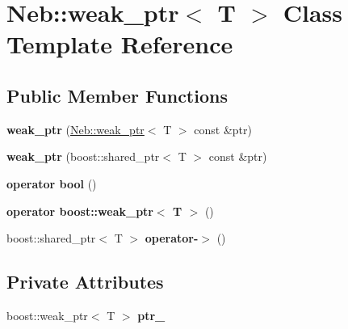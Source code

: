 \hypertarget{classNeb_1_1weak__ptr}{\section{\-Neb\-:\-:weak\-\_\-ptr$<$ \-T $>$ \-Class \-Template \-Reference}
\label{classNeb_1_1weak__ptr}
}
\subsection*{\-Public \-Member \-Functions}
\begin{DoxyCompactItemize}
\item 
\hypertarget{classNeb_1_1weak__ptr_a831fec6c1355a9d91e834099c0dc6227}{{\bfseries weak\-\_\-ptr} (\hyperlink{classNeb_1_1weak__ptr}{\-Neb\-::weak\-\_\-ptr}$<$ \-T $>$ const \&ptr)}\label{classNeb_1_1weak__ptr_a831fec6c1355a9d91e834099c0dc6227}

\item 
\hypertarget{classNeb_1_1weak__ptr_ad29ba574546701e7ed8a0b452dcd76a6}{{\bfseries weak\-\_\-ptr} (boost\-::shared\-\_\-ptr$<$ \-T $>$ const \&ptr)}\label{classNeb_1_1weak__ptr_ad29ba574546701e7ed8a0b452dcd76a6}

\item 
\hypertarget{classNeb_1_1weak__ptr_a04c92f7e5ec8e3e83d2abce8365b8feb}{{\bfseries operator bool} ()}\label{classNeb_1_1weak__ptr_a04c92f7e5ec8e3e83d2abce8365b8feb}

\item 
\hypertarget{classNeb_1_1weak__ptr_ab67828010c104deb340eb460148b651d}{{\bfseries operator boost\-::weak\-\_\-ptr$<$ T $>$} ()}\label{classNeb_1_1weak__ptr_ab67828010c104deb340eb460148b651d}

\item 
\hypertarget{classNeb_1_1weak__ptr_afb380fd10451d5f26809091e54cde62f}{boost\-::shared\-\_\-ptr$<$ \-T $>$ {\bfseries operator-\/$>$} ()}\label{classNeb_1_1weak__ptr_afb380fd10451d5f26809091e54cde62f}

\end{DoxyCompactItemize}
\subsection*{\-Private \-Attributes}
\begin{DoxyCompactItemize}
\item 
\hypertarget{classNeb_1_1weak__ptr_a9ffc8d0fd4564e9e82d6827570768603}{boost\-::weak\-\_\-ptr$<$ \-T $>$ {\bfseries ptr\-\_\-}}\label{classNeb_1_1weak__ptr_a9ffc8d0fd4564e9e82d6827570768603}

\end{DoxyCompactItemize}
